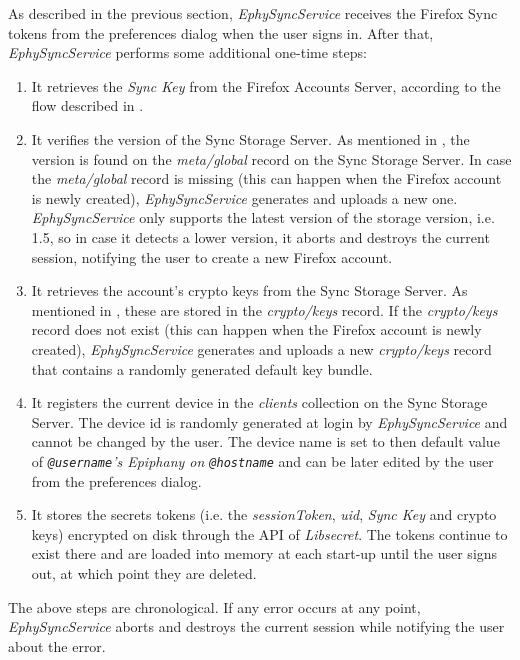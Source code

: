 As described in the previous section, \textit{EphySyncService} receives the Firefox Sync tokens from the preferences dialog when the user signs in. After that, \textit{EphySyncService} performs some additional one-time steps:
\begin{enumerate}
  \item It retrieves the \textit{Sync Key} from the Firefox Accounts Server, according to the flow described in .
  \item It verifies the version of the Sync Storage Server. As mentioned in , the version is found on the \textit{meta/global} record on the Sync Storage Server. In case the \textit{meta/global} record is missing (this can happen when the Firefox account is newly created), \textit{EphySyncService} generates and uploads a new one. \textit{EphySyncService} only supports the latest version of the storage version, i.e. 1.5, so in case it detects a lower version, it aborts and destroys the current session, notifying the user to create a new Firefox account.
  \item It retrieves the account's crypto keys from the Sync Storage Server. As mentioned in , these are stored in the \textit{crypto/keys} record. If the \textit{crypto/keys} record does not exist (this can happen when the Firefox account is newly created), \textit{EphySyncService} generates and uploads a new \textit{crypto/keys} record that contains a randomly generated default key bundle.
  \item It registers the current device in the \textit{clients} collection on the Sync Storage Server. The device id is randomly generated at login by \textit{EphySyncService} and cannot be changed by the user. The device name is set to then default value of \textit{{\tt @username}'s Epiphany on {\tt @hostname}} and can be later edited by the user from the preferences dialog.
  \item It stores the secrets tokens (i.e. the \textit{sessionToken}, \textit{uid}, \textit{Sync Key} and crypto keys) encrypted on disk through the API of \textit{Libsecret}. The tokens continue to exist there and are loaded into memory at each start-up until the user signs out, at which point they are deleted.
\end{enumerate}

The above steps are chronological. If any error occurs at any point, \textit{EphySyncService} aborts and destroys the current session while notifying the user about the error.


